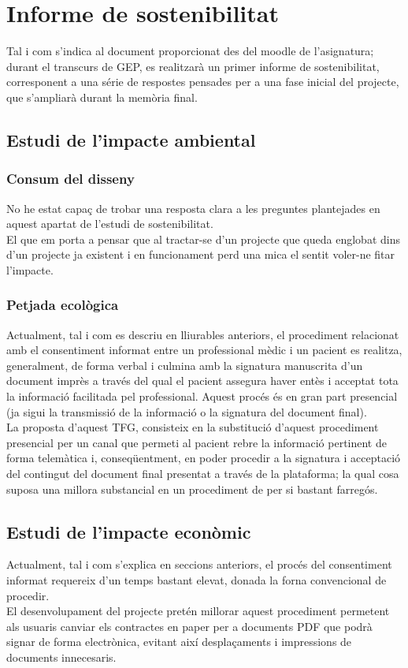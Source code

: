 \section{Informe de sostenibilitat}

Tal i com s'indica al document proporcionat des del moodle de l'asignatura; durant el transcurs de GEP, es realitzarà un primer informe de sostenibilitat, corresponent a una série de respostes pensades per a una fase inicial del projecte, que s'ampliarà durant la memòria final.

\subsection{Estudi de l'impacte ambiental}
\subsubsection{Consum del disseny}
No he estat capaç de trobar una resposta clara a les preguntes plantejades en aquest apartat de l'estudi de sostenibilitat.\\
El que em porta a pensar que al tractar-se d'un projecte que queda englobat dins d'un projecte ja existent i en funcionament perd una mica el sentit voler-ne fitar l'impacte.
\subsubsection{Petjada ecològica}
Actualment, tal i com es descriu en lliurables anteriors, el procediment relacionat amb el consentiment informat entre un professional mèdic i un pacient es realitza, generalment, de forma verbal i culmina amb la signatura manuscrita d'un document imprès a través del qual el pacient assegura haver entès i acceptat tota la informació facilitada pel professional.
Aquest procés és en gran part presencial (ja sigui la transmissió de la informació o la signatura del document final).\\
\newline La proposta d'aquest TFG, consisteix en la substitució d'aquest procediment presencial per un canal que permeti al pacient rebre la informació pertinent de forma telemàtica i, conseqüentment, en poder procedir a la signatura i acceptació del contingut del document final presentat a través de la plataforma; la qual cosa suposa una millora substancial en un procediment de per si bastant farregós.

\subsection{Estudi de l'impacte econòmic}
Actualment, tal i com s'explica en seccions anteriors, el procés del consentiment informat requereix d'un temps bastant elevat, donada la forna convencional de procedir.\\
El desenvolupament del projecte pretén millorar aquest procediment permetent als usuaris canviar els contractes en paper per a documents PDF que podrà signar de forma electrònica, evitant així desplaçaments i impressions de documents innecesaris.

